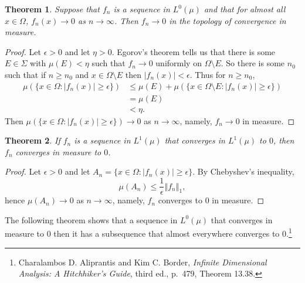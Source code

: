 \documentclass{article}
\newcommand{\norm}[1]{\left\Vert #1 \right\Vert}
\newtheorem{theorem}{Theorem}
\theoremstyle{definition}
\begin{document}
\begin{theorem}
Suppose that $f_n$ is a sequence in $L^0(\mu)$ and that for  almost all $x \in \Omega$,
$f_n(x) \to 0$ as $n \to \infty$. Then $f_n \to 0$ in the topology of convergence in measure.
\end{theorem}
\begin{proof}
Let $\epsilon>0$ and let $\eta>0$. Egorov's theorem tells us that there is some $E \in \Sigma$ with
$\mu(E)<\eta$  such that
$f_n \to 0$ uniformly on $\Omega \setminus E$.
So there is some $n_0$ such that if  
 $n \geq n_0$ and $x \in \Omega \setminus E$ then
$|f_n(x)|<\epsilon$. 
Thus for $n \geq n_0$,
\begin{align*}
\mu(\{x \in \Omega: |f_n(x)| \geq \epsilon\})&\leq \mu(E)+
\mu(\{x \in \Omega \setminus E: |f_n(x)| \geq \epsilon\})\\
&=\mu(E)\\
&<\eta.
\end{align*}
Then $\mu(\{x \in \Omega: |f_n(x)| \geq \epsilon\}) \to 0$ as $n \to \infty$, namely, 
$f_n \to 0$ in measure.
\end{proof}

\begin{theorem}
If $f_n$ is a sequence in $L^1(\mu)$  that converges in $L^1(\mu)$ to $0$, then
$f_n$ converges in measure to $0$.
\end{theorem}
\begin{proof}
Let $\epsilon>0$ and let $A_n=\{x \in \Omega: |f_n(x)| \geq \epsilon\}$.
By Chebyshev's inequality,
\[
\mu(A_n) \leq \frac{1}{\epsilon} \norm{f_n}_1,
\]
hence $\mu(A_n) \to 0$ as $n \to \infty$, namely, $f_n$ converges to $0$ in measure.
\end{proof}


The following theorem shows that a sequence in $L^0(\mu)$ that converges in measure to $0$
then it has a subsequence that almost everywhere converges to  $0$.\footnote{Charalambos D. 
Aliprantis and Kim C. Border, {\em Infinite Dimensional Analysis: A Hitchhiker's Guide}, third ed., p.~479,
Theorem 13.38.} 
\end{document}
